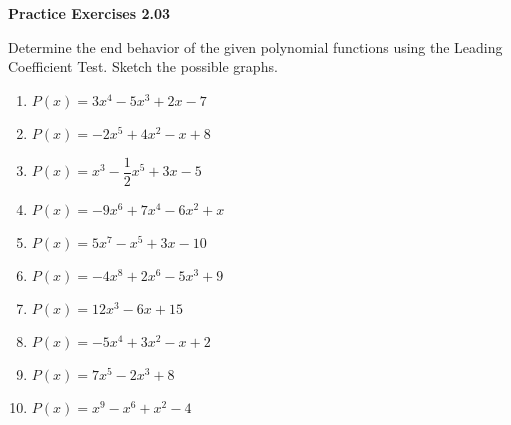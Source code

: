 \vspace{0.3ex}
\noindent\textbf{Practice Exercises 2.03}

\vspace{0.2ex}

Determine the end behavior of the given polynomial functions using the Leading Coefficient Test. Sketch the possible graphs.
\begin{multicols}{2}
\begin{enumerate}
    \item \( P(x) = 3x^4 - 5x^3 + 2x - 7 \)
    \item \( P(x) = -2x^5 + 4x^2 - x + 8 \)
    \item \( P(x) = x^3 - \dfrac{1}{2}x^5 + 3x - 5 \)
    \item \( P(x) = -9x^6 + 7x^4 - 6x^2 + x \)
    \item \( P(x) = 5x^7 - x^5 + 3x - 10 \)
    \item \( P(x) = -4x^8 + 2x^6 - 5x^3 + 9 \)
    \item \( P(x) = 12x^3 - 6x + 15 \)
    \item \( P(x) = -5x^4 + 3x^2 - x + 2 \)
    \item \( P(x) = 7x^5 - 2x^3 + 8 \)
    \item \( P(x) = x^9 - x^6 + x^2 - 4 \)
\end{enumerate}
\end{multicols}
